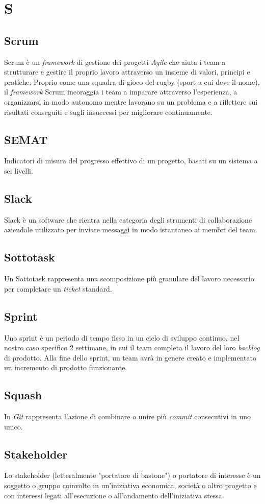 \chapter{S}

\section{Scrum}
Scrum è un \emph{framework} di gestione dei progetti \emph{Agile} che aiuta i team a strutturare e gestire il proprio lavoro attraverso un insieme di valori, principi e pratiche. Proprio come una squadra di gioco del rugby (sport a cui deve il nome), il \emph{framework} Scrum incoraggia i team a imparare attraverso l'esperienza, a organizzarsi in modo autonomo mentre lavorano su un problema e a riflettere sui risultati conseguiti e sugli insuccessi per migliorare continuamente.

\section{SEMAT}
Indicatori di misura del progresso effettivo di un progetto, basati su un sistema a sei livelli.

\section{Slack}
Slack è un software che rientra nella categoria degli strumenti di collaborazione aziendale utilizzato per inviare messaggi in modo istantaneo ai membri del team.

\section{Sottotask}
Un Sottotask rappresenta una scomposizione più granulare del lavoro necessario per completare un \emph{ticket} standard.

\section{Sprint}
Uno sprint è un periodo di tempo fisso in un ciclo di sviluppo continuo, nel nostro caso specifico 2 settimane, in cui il team completa il lavoro del loro \emph{backlog} di prodotto. Alla fine dello sprint, un team avrà in genere creato e implementato un incremento di prodotto funzionante.

\section{Squash}
In \emph{Git} rappresenta l'azione di combinare o unire più \emph{commit} consecutivi in uno unico.

\section{Stakeholder}
Lo stakeholder (letteralmente "portatore di bastone") o portatore di interesse è un soggetto o gruppo coinvolto in un'iniziativa economica, società o altro progetto e con interessi legati all’esecuzione o all’andamento dell'iniziativa stessa.